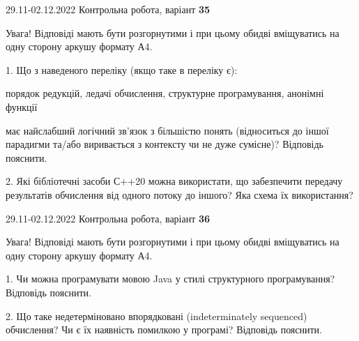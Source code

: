 \documentclass[11pt, ukrainian]{article}
\begin{document}
\vspace{4mm}



{29.11-02.12.2022 Контрольна робота, варіант  \No \textbf { 35 }\par}
Увага! Відповіді мають бути розгорнутими і при цьому обидві вміщуватись на одну сторону аркушу формату А4.

{
\begin {large}

1. Що з наведеного переліку (якщо таке в переліку є):

\vspace{4mm}
 порядок редукцій, ледачі обчислення, структурне програмування, анонімні функції

\vspace{4mm}
має найслабший логічний зв’язок з більшістю понять (відноситься до іншої парадигми та/або виривається з контексту чи не дуже сумісне)? Відповідь пояснити.


2. Які бібліотечні засоби С++20 можна використати, що забезпечити передачу результатів обчислення від одного потоку до іншого? Яка схема їх використання?

\end {large}}

\vspace{4mm}



{29.11-02.12.2022 Контрольна робота, варіант  \No \textbf { 36 }\par}
Увага! Відповіді мають бути розгорнутими і при цьому обидві вміщуватись на одну сторону аркушу формату А4.

{
\begin {large}

1. Чи можна програмувати мовою Java у стилі структурного програмування? Відповідь пояснити.%

2. Що таке недетерміновано впорядковані (indeterminately sequenced) обчислення? Чи є їх наявність помилкою у програмі?  Відповідь пояснити.

\end {large}}

\vspace{4mm}
\newpage
\end{document}
